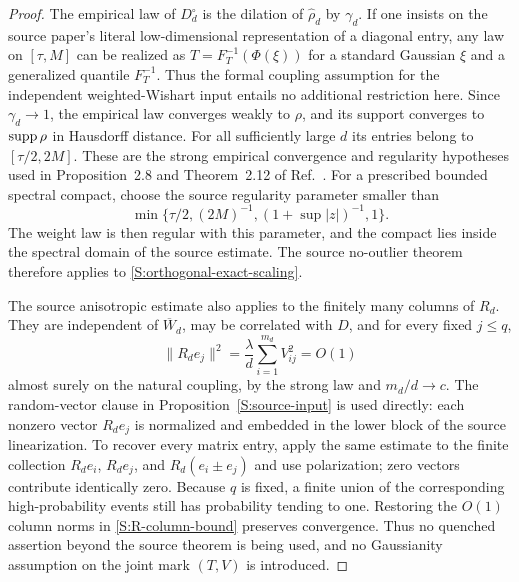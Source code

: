 \begin{proof}
The empirical law of $D_d^\circ$ is the dilation of
$\widehat\rho_d$ by $\gamma_d$. If one insists on the source paper's
literal low-dimensional representation of a diagonal entry, any law on
$[\tau,M]$ can be realized as
$T=F_T^{-1}(\Phi(\xi))$ for a standard Gaussian $\xi$ and a generalized
quantile $F_T^{-1}$. Thus the formal coupling assumption for the independent
weighted-Wishart input entails no additional restriction here. Since
$\gamma_d\to1$, the empirical law converges weakly
to $\rho$, and its support converges to $\operatorname{supp}\rho$ in Hausdorff distance.
For all sufficiently large $d$ its entries belong to
$[\tau/2,2M]$.  These are the strong empirical convergence and regularity
hypotheses used in Proposition~2.8 and Theorem~2.12 of
Ref.~\cite{BenArousEtAl2025}.  For a prescribed bounded spectral compact, choose the source regularity
parameter smaller than
\begin{equation}
\min\{\tau/2,(2M)^{-1},(1+\sup|z|)^{-1},1\}.
\end{equation}
The weight law is then regular with this parameter, and the compact lies
inside the spectral domain of the source estimate.
The source no-outlier theorem therefore applies to \eqref{S:orthogonal-exact-scaling}.

The source anisotropic estimate also applies to the finitely many columns
of $R_d$.  They are independent of $\overline W_d$, may be correlated with
$D$, and for every fixed $j\le q$,
\begin{equation}
\|R_d e_j\|^2
=
\frac{\lambda}{d}\sum_{i=1}^{m_d}V_{ij}^2
=O(1)
\label{S:R-column-bound}
\end{equation}
almost surely on the natural coupling, by the strong law and
$m_d/d\to c$.  The random-vector clause in
Proposition~\ref{S:source-input} is used directly: each nonzero vector
$R_d e_j$ is normalized and embedded in the lower block of the source
linearization.  To recover every matrix entry, apply the same estimate to
the finite collection $R_d e_i$, $R_d e_j$, and
$R_d(e_i\pm e_j)$ and use polarization; zero vectors contribute
identically zero.  Because $q$ is fixed, a finite union of the corresponding
high-probability events still has probability tending to one.  Restoring
the $O(1)$ column norms in \eqref{S:R-column-bound} preserves convergence.
Thus no quenched assertion beyond the source theorem is being used, and no
Gaussianity assumption on the joint mark $(T,V)$ is introduced.


\end{proof}
